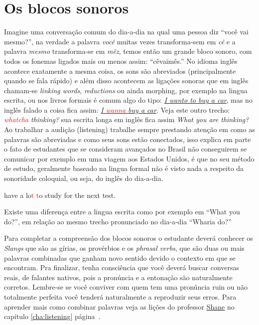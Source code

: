 
\section{Os blocos sonoros}\label{sec:blocos-sonoros}

Imagine uma conversação comum do dia-a-dia na qual uma pessoa diz
``você vai mesmo?'', na verdade a palavra {\em você} muitas vezes
transforma-sem em {\em cê} e a palavra {\em mesmo} transforma-se em
{\em mêz}, temos então um grande bloco sonoro, com todos os fonemas
ligados mais ou menos assim: ``cêvaimês.'' No idioma inglês acontece
exatamente a mesma coisa, os sons são abreviados (principalmente
quando se fala rápido) e além disso acontecem as ligações sonoras que
em inglês chamam-se {\em linking words}, {\em reductions} ou ainda
morphing, por exemplo na lingua escrita, ou nos livros formais é comum algo do tipo:
\underline{{\em I wanto to buy a car}}, mas no inglês falado a coisa fica assim:
{\em  \underline{I \textcolor{red}{wanna} buy a car}}. Veja este outro trecho:
\emph{\textcolor{red}{whatcha} thinking?} sua escrita longa em inglês fica assim \emph{What you are thinking?}
Ao trabalhar a audição (listening) trabalhe sempre prestando atenção em como as palavras são
abreviadas e como seus sons estão conectados, isso explica em parte o
fato de estudantes que se consideram avançados no Brasil não
conseguirem se comunicar por exemplo em uma viagem aos Estados Unidos,
é que no seu método de estudo, geralmente baseado na lingua formal não
é visto nada a respeito da sonoridade coloquial, ou seja, do inglês do
dia-a-dia.

\vspace{0.5cm}
{\footnotesize {}  have a lo\textcolor{red}{t t}o study for the next test.}
\vspace{0.5cm}

\noindent
Existe uma diferença entre a lingua escrita como por exemplo em ``What you do?'',
em relação ao mesmo trecho pronunciado no dia-a-dia ``Wharia do?''
\vspace{0.5cm}

\noindent
Para completar a compreensão dos blocos sonoros o estudante deverá conhecer os
{\em Slangs} que são as gírias, os provérbios e os {\em phrasal verbs}, que são
duas ou mais palavras combinadas que ganham novo sentido devido o contexto em
que se encontram.  Pra finalizar, tenha consciência que você deverá buscar
conversas reais, de falantes nativos, pois a pronúncia e a entonação são
naturalmente corretos. Lembre-se se você conviver com quem tem uma pronúncia
ruin ou não totalmente perfeita você tenderá naturalmente a reproduzir seus
erros. Para aprender mais como combinar palavras veja as lições do
professor \hyperlink{shane}{Shane} no capítulo \ref{cha:listening} página~\pageref{cha:listening}.

